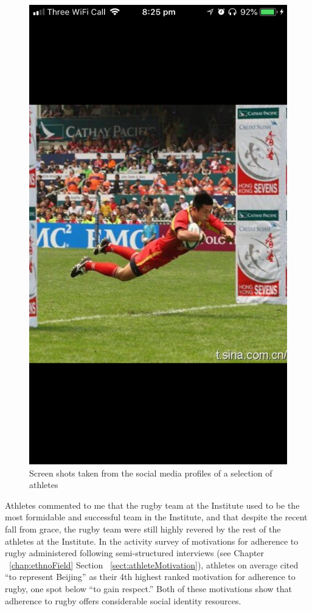 \begin{CJK}{UTF8}{gbsn}
\begin{figure}[htbp]
\begin{center}
             \includegraphics[scale =.1]{images/bjmWeChatProfile4.png}
             \caption{Screen shots taken from the social media profiles of a selection of athletes}
           \end{center}
             \label{fig:bjmWeChatProfile}
         \end{figure}

Athletes commented to me that the rugby team at the Institute used to be the most formidable and successful team in the Institute, and that despite the recent fall from grace, the rugby team were still highly revered by the rest of the athletes at the Institute.  In the activity survey of motivations for adherence to rugby administered following semi-structured interviews (see Chapter ~\ref{chap:ethnoField} Section ~\ref{sect:athleteMotivation}), athletes on average cited ``to represent Beijing'' as their 4th highest ranked motivation for adherence to rugby, one spot below ``to gain respect.''  Both of these motivations show that adherence to rugby offers considerable social identity resources.


\end{CJK}

